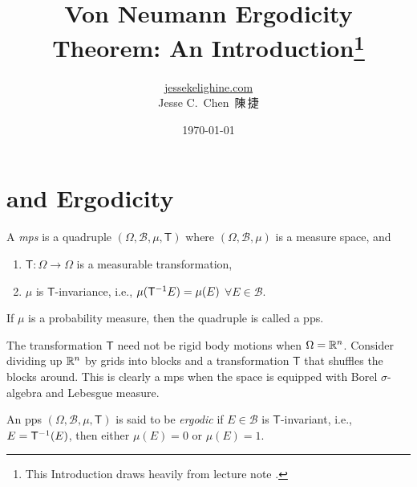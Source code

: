 \documentclass[a4paper]{article}
\title{Von Neumann Ergodicity Theorem: An Introduction\thanks{This Introduction draws heavily from lecture note \cite{sarig-2023}.}}
\author{\href{https://jessekelighine.com}{jessekelighine.com}\\Jesse C.\ Chen\ 陳\,捷}
\date{\today}
\begin{document}
\maketitle\thispagestyle{fancy}

\section{ and Ergodicity}

\begin{definition}
	A \emph{\gls{mps}} is a quadruple $(\Omega,\mathcal{B},\mu,\mathsf{T})$
	where $\left(\Omega,\mathcal{B},\mu\right)$ is a measure space, and
	\begin{enumerate}
		\item $\mathsf{T}:\Omega\to \Omega$ is a measurable transformation,
		\item $\mu$ is $\mathsf{T}$-invariance, i.e., $\mu(\mathsf{T}^{-{1}} E)=\mu(E)$ $\forall E\in\mathcal{B}$.
	\end{enumerate}
	If $\mu$ is a probability measure, then the quadruple is called a \gls{pps}.
\end{definition}

\begin{remark}
	The transformation $\mathsf{T}$ need not be rigid body motions when $\Omega=\mathbb{R}^n$.
	Consider dividing up $\mathbb{R}^n$ by grids into blocks and a transformation $\mathsf{T}$ that shuffles the blocks around.
	This is clearly a \gls{mps} when the space is equipped with Borel $\sigma$-algebra and Lebesgue measure.
\end{remark}

\begin{definition}[Ergodic]
	An \gls{pps} $(\Omega,\mathcal{B},\mu,\mathsf{T})$ is said to be \emph{ergodic}
	if $E\in\mathcal{B}$ is $\mathsf{T}$-invariant, i.e.,
	$E=\mathsf{T}^{-{1}}(E)$, then either $\mu(E)=0$ or $\mu(E)=1$.
\end{definition}
\end{document}
